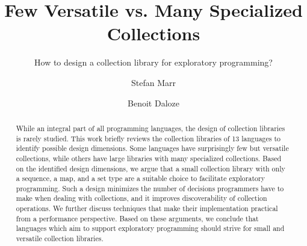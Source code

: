 \documentclass[sigconf, 10pt]{acmart}
\def\Title{Few Versatile vs. Many Specialized Collections}
\def\SubTitle{How to design a collection library for exploratory programming?}
\begin{document}
\title{\Title}
\subtitle{\SubTitle}

\author{Stefan Marr}

\author{Benoit Daloze}




\begin{abstract}
While an integral part of all programming languages,
the design of collection libraries is rarely studied.
This work briefly reviews the collection libraries of 13 languages
to identify possible design dimensions.
Some languages have surprisingly few but versatile collections,
while others have large libraries with many specialized collections.
Based on the identified design dimensions,
we argue that a small collection library
with only a sequence, a map, and a set type
are a suitable choice to facilitate exploratory programming.
Such a design minimizes the number of decisions programmers
have to make when dealing with collections,
and it improves discoverability of collection operations.
We further discuss
techniques
that make their implementation practical from a performance perspective.
Based on these arguments,
we conclude that languages which aim to support exploratory programming
should strive for small and versatile collection libraries.
\end{abstract}
\end{document}
